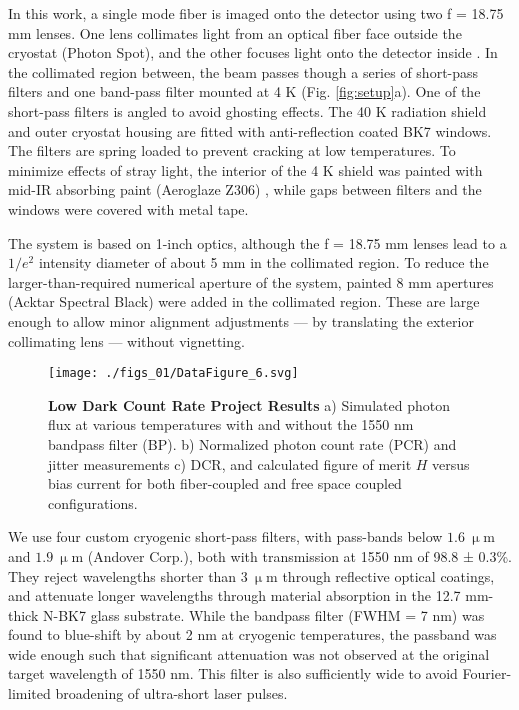 \documentclass[12pt]{caltech_thesis}
\begin{document}
In this work, a single mode fiber is imaged onto the detector using two
f = 18.75 mm lenses. One lens collimates light from an optical fiber
face outside the cryostat (Photon Spot), and the other focuses light
onto the detector inside \autocite{Bellei:16}. In the collimated region
between, the beam passes though a series of short-pass filters and one
band-pass filter mounted at 4 K (Fig. \ref{fig:setup}a). One of the
short-pass filters is angled to avoid ghosting effects. The 40 K
radiation shield and outer cryostat housing are fitted with
anti-reflection coated BK7 windows. The filters are spring loaded to
prevent cracking at low temperatures. To minimize effects of stray
light, the interior of the 4 K shield was painted with mid-IR absorbing
paint (Aeroglaze Z306) \autocite{Persky1999}, while gaps between filters
and the windows were covered with metal tape.

The system is based on 1-inch optics, although the f = 18.75 mm lenses
lead to a \(1/e^2\) intensity diameter of about 5 mm in the collimated
region. To reduce the larger-than-required numerical aperture of the
system, painted 8 mm apertures (Acktar Spectral Black) were added in the
collimated region. These are large enough to allow minor alignment
adjustments --- by translating the exterior collimating lens --- without
vignetting.

\hypertarget{fig:dcrmin_data}{%
\begin{figure}
\centering
\texttt{[image: ./figs\_01/DataFigure\_6.svg]}
\caption[{Low Dark Count Rate Project Results.}]{\textbf{Low Dark Count
Rate Project Results} a) Simulated photon flux at various temperatures
with and without the 1550 nm bandpass filter (BP). b) Normalized photon
count rate (PCR) and jitter measurements c) DCR, and calculated figure
of merit \(H\) versus bias current for both fiber-coupled and free space
coupled configurations.}
\label{fig:dcrmin_data}
\end{figure}
}

We use four custom cryogenic short-pass filters, with pass-bands below
\(1.6 \ \mathrm{\upmu m}\) and \(1.9 \ \mathrm{\upmu m}\) (Andover
Corp.), both with transmission at 1550 nm of 98.8 ± 0.3\%. They reject
wavelengths shorter than \(3 \ \mathrm{\upmu m}\) through reflective
optical coatings, and attenuate longer wavelengths through material
absorption in the 12.7 mm-thick N-BK7 glass substrate. While the
bandpass filter (FWHM = 7 nm) was found to blue-shift by about 2 nm at
cryogenic temperatures, the passband was wide enough such that
significant attenuation was not observed at the original target
wavelength of 1550 nm. This filter is also sufficiently wide to avoid
Fourier-limited broadening of ultra-short laser pulses.
\end{document}
